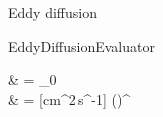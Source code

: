 Eddy diffusion 
\begin{equationCode}{EddyDiffusionEvaluator}
\begin{split}
\eddy              &     = \eddy_0   \\
\uu [cm^2\,s^{-1}] & \uu = [cm^2\,s^{-1}] \left(\frac{[cm^{-3}]}{[cm^{-3}]}\right)^{}
\end{split}
\label{Titan:eddy_diff}
\end{equationCode}
